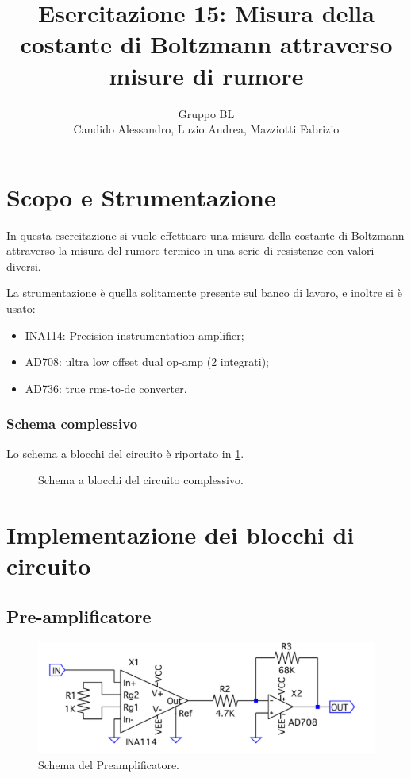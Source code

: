 \documentclass[a4paper,10pt]{article}
\title{Esercitazione 15: Misura della costante di Boltzmann attraverso misure di rumore}
\author{Gruppo BL \\ Candido Alessandro, Luzio Andrea, Mazziotti Fabrizio}
\begin{document}
\maketitle

\section{Scopo e Strumentazione}
In questa esercitazione si vuole effettuare una misura della costante di Boltzmann attraverso la
misura del rumore termico in una serie di resistenze con valori diversi.

\noindent La strumentazione è quella solitamente presente sul banco di lavoro, e inoltre si è usato:
\begin{itemize}
	\item INA114: Precision instrumentation amplifier;
	\item AD708: ultra low offset dual op-amp (2 integrati);
	\item AD736: true rms-to-dc converter.
\end{itemize}

\subsubsection*{Schema complessivo}

Lo schema a blocchi del circuito è riportato in \cref{fig:blocks}.

\begin{figure}[H]
	\centering
	\vspace*{10pt}
	\caption{Schema a blocchi del circuito complessivo.}
	\label{fig:blocks}
\end{figure}

\section{Implementazione dei blocchi di circuito}

\subsection{Pre-amplificatore}

\begin{figure}[H]
	\centering
	\includegraphics[width=\textwidth]{../grafici/preamp.png}
	\vspace*{10pt}
	\caption{Schema del Preamplificatore.}
	\label{fig:preamp}
\end{figure}
\end{document}
